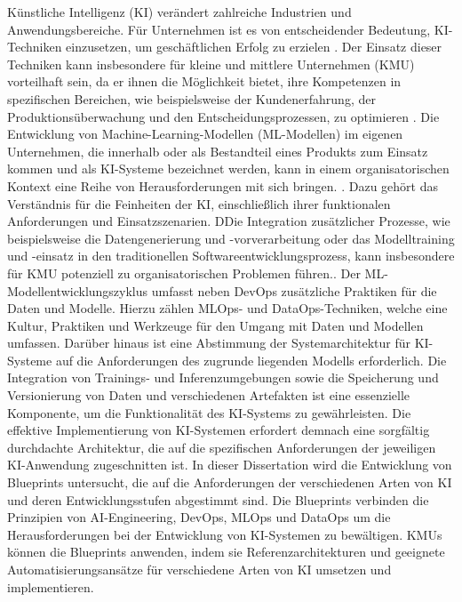 \documentclass[11pt,a4paper,pointlessnumbers]{scrartcl}
\theoremstyle{break}
\numberwithin{equation}{section}
\begin{document}
Künstliche Intelligenz (KI) verändert zahlreiche Industrien und Anwendungsbereiche. Für Unternehmen ist es von entscheidender Bedeutung, KI-Techniken einzusetzen, um geschäftlichen Erfolg zu erzielen \cite{enholmArtificialIntelligenceBusiness2022, loureiroArtificialIntelligenceBusiness2021}. 
Der Einsatz dieser Techniken kann insbesondere für kleine und mittlere Unternehmen (KMU) vorteilhaft sein, da er ihnen die Möglichkeit bietet, ihre Kompetenzen in spezifischen Bereichen, wie beispielsweise der Kundenerfahrung, der Produktionsüberwachung und den Entscheidungsprozessen, zu optimieren \cite{bhaleraoStudyBarriersBenefits2022}.
Die Entwicklung von Machine-Learning-Modellen (ML-Modellen) im eigenen Unternehmen, die innerhalb oder als Bestandteil eines Produkts zum Einsatz kommen und als KI-Systeme bezeichnet werden, kann in einem organisatorischen Kontext eine Reihe von Herausforderungen mit sich bringen. \cite{fischerAISystemEngineering2020,lwakatareDevOpsAIChallenges2020,schonbergerArtificialIntelligenceSmall2023, nascimentoUnderstandingDevelopmentProcess2019}. 
Dazu gehört das Verständnis für die Feinheiten der KI, einschließlich ihrer funktionalen Anforderungen und Einsatzszenarien. DDie Integration zusätzlicher Prozesse, wie beispielsweise die Datengenerierung und -vorverarbeitung oder das Modelltraining und -einsatz in den traditionellen Softwareentwicklungsprozess, kann insbesondere für KMU potenziell zu organisatorischen Problemen führen.\cite{schonbergerArtificialIntelligenceSmall2023}. 
Der ML-Modellentwicklungszyklus umfasst neben DevOps zusätzliche Praktiken für die Daten und Modelle. Hierzu zählen MLOps- und DataOps-Techniken, welche eine Kultur, Praktiken und Werkzeuge für den Umgang mit Daten und Modellen umfassen. 
Darüber hinaus ist eine Abstimmung der Systemarchitektur für KI-Systeme auf die Anforderungen des zugrunde liegenden Modells erforderlich. Die Integration von Trainings- und Inferenzumgebungen sowie die Speicherung und Versionierung von Daten und verschiedenen Artefakten ist eine essenzielle Komponente, um die Funktionalität des KI-Systems zu gewährleisten.
Die effektive Implementierung von KI-Systemen erfordert demnach eine sorgfältig durchdachte Architektur, die auf die spezifischen Anforderungen der jeweiligen KI-Anwendung zugeschnitten ist.
In dieser Dissertation wird die Entwicklung von Blueprints untersucht, die auf die Anforderungen der verschiedenen Arten von KI und deren Entwicklungsstufen abgestimmt sind. Die Blueprints verbinden die Prinzipien von AI-Engineering, DevOps, MLOps und DataOps um die Herausforderungen bei der Entwicklung von KI-Systemen zu bewältigen. KMUs können die Blueprints anwenden, indem sie Referenzarchitekturen und geeignete Automatisierungsansätze für verschiedene Arten von KI umsetzen und implementieren.
\end{document}
